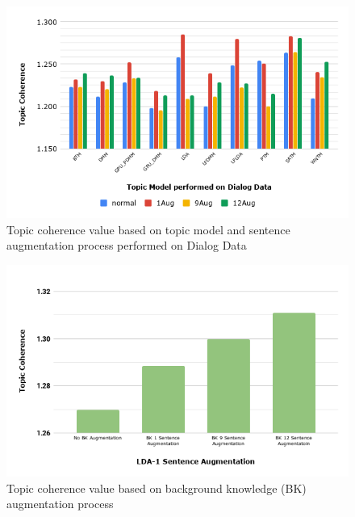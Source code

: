 \documentclass[conference]{IEEEtran}
\begin{document}
\begin{table}[b]
\caption{Dataset Property}
\label{table 4: dataset property}
\end{table}

\begin{figure}[b]
	\includegraphics[scale=0.425]{topic1.png}
	\caption{Topic coherence value based on topic model and sentence augmentation process performed on Dialog Data}
\label{fig_tme}
\end{figure}

\begin{figure}[t]
	\includegraphics[scale=0.425]{topic2.png}
	\caption{Topic coherence value based on background knowledge (BK) augmentation process}
\label{fig_tme2}
\end{figure}
\end{document}
